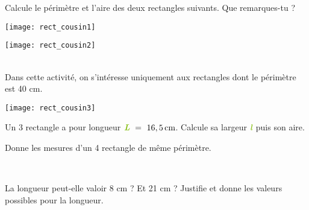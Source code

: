 \newpage


\begin{activite}

\begin{partie}
Calcule le périmètre et l'aire des deux rectangles suivants. Que remarques-tu ?

\begin{minipage}[c]{0.48\linewidth}
 \begin{center} \texttt{[image: rect\_cousin1]} \end{center}
 \end{minipage} \hfill%
 \begin{minipage}[c]{0.48\linewidth}
 \begin{center} \texttt{[image: rect\_cousin2]} \end{center}
  \end{minipage}\\[0.5em]
Dans cette activité, on s'intéresse uniquement aux rectangles dont le périmètre est 40 cm.
\end{partie}


\begin{minipage}[c]{0.28\linewidth}
 \texttt{[image: rect\_cousin3]}
 \end{minipage} \hfill%
 \begin{minipage}[c]{0.64\linewidth}
\vspace{1em}
\begin{partie}
Un 3 rectangle a pour longueur $\emph{\textbf{\textcolor{H1}{L}}} = 16,5\,\text{cm}$. Calcule sa largeur $\emph{\textbf{\textcolor{H1}{l}}}$ puis son aire.
\end{partie}

\begin{partie}
Donne les mesures d'un 4 rectangle de même périmètre.
\end{partie}
  \end{minipage} \\

\begin{partie}
La longueur peut-elle valoir 8 cm ? Et 21 cm ? Justifie et donne les valeurs possibles pour la longueur.
\end{partie}


\end{activite}
